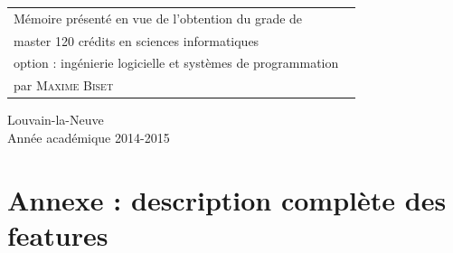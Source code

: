 \documentclass[british]{article}
\renewcommand\title{Analyse et développement d'un framework open source d'online banking pour des organisations d'échange social en monnaies complémentaires}
\newcommand\name{\textsc{Maxime Biset}}
\newcommand\years{2014-2015}
\begin{document}
\begin{minipage}{.5\textwidth}
\begin{tabular}{l}
Mémoire présenté en vue de l'obtention du grade de
\\ master 120 crédits en sciences informatiques
\\ option : ingénierie logicielle et systèmes de programmation \
\\ par \name \
\end{tabular}
\end{minipage}
\vfill
\begin{center}
Louvain-la-Neuve
\\ Année académique \years
\end{center}




\section{Annexe : description complète des features}

\end{document}

